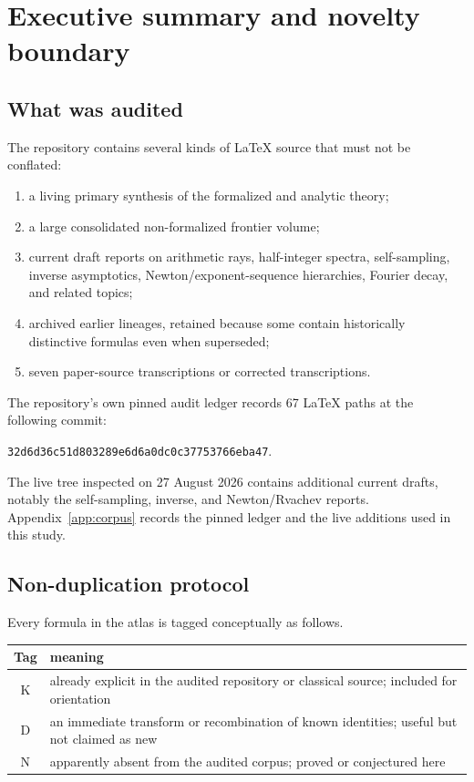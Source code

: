 \documentclass[11pt]{article}
\theoremstyle{definition}
\theoremstyle{remark}
\newcommand{\statusknown}{\textsf{K}}
\newcommand{\statusderived}{\textsf{D}}
\newcommand{\statusnew}{\textsf{N}}
\begin{document}
\tableofcontents
\newpage

\section{Executive summary and novelty boundary}

\subsection{What was audited}

The repository contains several kinds of LaTeX source that must not be conflated:

\begin{enumerate}
\item a living primary synthesis of the formalized and analytic theory;
\item a large consolidated non-formalized frontier volume;
\item current draft reports on arithmetic rays, half-integer spectra, self-sampling,
      inverse asymptotics, Newton/exponent-sequence hierarchies, Fourier decay, and related
      topics;
\item archived earlier lineages, retained because some contain historically distinctive
      formulas even when superseded;
\item seven paper-source transcriptions or corrected transcriptions.
\end{enumerate}

The repository's own pinned audit ledger records 67 LaTeX paths at the following commit:
\begin{center}
\small\texttt{32d6d36c51d803289e6d6a0dc0c37753766eba47}.
\end{center}
The live tree inspected on 27 August 2026 contains additional current drafts, notably the
self-sampling, inverse, and Newton/Rvachev reports.  Appendix~\ref{app:corpus} records the pinned ledger and the live
additions used in this study.

\subsection{Non-duplication protocol}

Every formula in the atlas is tagged conceptually as follows.

\begin{center}
\begin{tabular}{@{}c p{}@{}}
\toprule
Tag & meaning \\
\midrule
\statusknown & already explicit in the audited repository or classical source; included for orientation \\
\statusderived & an immediate transform or recombination of known identities; useful but not claimed as new \\
\statusnew & apparently absent from the audited corpus; proved or conjectured here \\
\bottomrule
\end{tabular}
\end{center}
\end{document}
